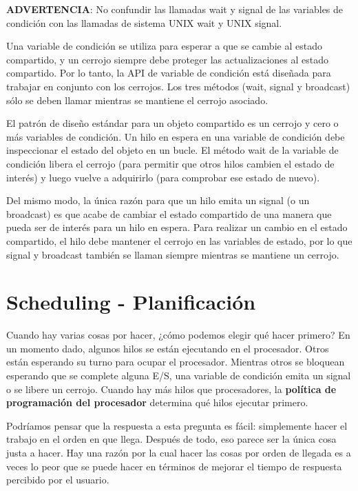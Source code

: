 \documentclass[10pt]{book}
\begin{document}
\textbf{ADVERTENCIA}: No confundir las llamadas {\mf wait} y {\mf signal} de las variables de condición con las llamadas de sistema {\mf UNIX wait} y {\mf UNIX signal}.

Una variable de condición se utiliza para esperar a que se cambie al estado compartido, y un cerrojo siempre debe proteger las actualizaciones al estado compartido. Por lo tanto, la API de variable de condición está diseñada para trabajar en conjunto con los cerrojos. Los tres métodos ({\mf wait}, {\mf signal} y {\mf broadcast}) sólo se deben llamar mientras se mantiene el cerrojo asociado.

El patrón de diseño estándar para un objeto compartido es un cerrojo y cero o más variables de condición. Un hilo en espera en una variable de condición debe inspeccionar el estado del objeto en un bucle. El método {\mf wait} de la variable de condición libera el cerrojo (para permitir que otros hilos cambien el estado de interés) y luego vuelve a adquirirlo (para comprobar ese estado de nuevo).

Del mismo modo, la única razón para que un hilo emita un {\mf signal} (o un {\mf broadcast}) es que acabe de cambiar el estado compartido de una manera que pueda ser de interés para un hilo en espera. Para realizar un cambio en el estado compartido, el hilo debe mantener el cerrojo en las variables de estado, por lo que {\mf signal} y {\mf broadcast} también se llaman siempre mientras se mantiene un cerrojo.

\setcounter{chapter}{6}
\chapter{Scheduling - Planificación}
Cuando hay varias cosas por hacer, ¿cómo podemos elegir qué hacer primero? En un momento dado, algunos hilos se están ejecutando en el procesador. Otros están esperando su turno para ocupar el procesador. Mientras otros se bloquean esperando que se complete alguna E/S, una variable de condición emita un {\mf signal} o se libere un cerrojo. Cuando hay más hilos que procesadores, la \textbf{política de programación del procesador} determina qué hilos ejecutar primero.

Podríamos pensar que la respuesta a esta pregunta es fácil: simplemente hacer el trabajo en el orden en que llega. Después de todo, eso parece ser la única cosa justa a hacer. Hay una razón por la cual hacer las cosas por orden de llegada es a veces lo peor que se puede hacer en términos de mejorar el tiempo de respuesta percibido por el usuario.
\end{document}
